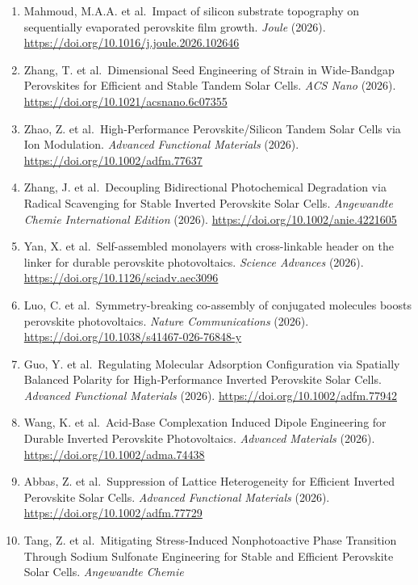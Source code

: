 \documentclass[
  11pt,
]{article}
\begin{document}
\begin{enumerate}
  Review. \emph{Zenodo (CERN European Organization for Nuclear
  Research)} (2026). \url{https://doi.org/10.5281/zenodo.21790600}
\item
  Mahmoud, M.A.A. et al.~Impact of silicon substrate topography on
  sequentially evaporated perovskite film growth. \emph{Joule} (2026).
  \url{https://doi.org/10.1016/j.joule.2026.102646}
\item
  Zhang, T. et al.~Dimensional Seed Engineering of Strain in
  Wide-Bandgap Perovskites for Efficient and Stable Tandem Solar Cells.
  \emph{ACS Nano} (2026). \url{https://doi.org/10.1021/acsnano.6c07355}
\item
  Zhao, Z. et al.~High‐Performance Perovskite/Silicon Tandem Solar Cells
  via Ion Modulation. \emph{Advanced Functional Materials} (2026).
  \url{https://doi.org/10.1002/adfm.77637}
\item
  Zhang, J. et al.~Decoupling Bidirectional Photochemical Degradation
  via Radical Scavenging for Stable Inverted Perovskite Solar Cells.
  \emph{Angewandte Chemie International Edition} (2026).
  \url{https://doi.org/10.1002/anie.4221605}
\item
  Yan, X. et al.~Self-assembled monolayers with cross-linkable header on
  the linker for durable perovskite photovoltaics. \emph{Science
  Advances} (2026). \url{https://doi.org/10.1126/sciadv.aec3096}
\item
  Luo, C. et al.~Symmetry-breaking co-assembly of conjugated molecules
  boosts perovskite photovoltaics. \emph{Nature Communications} (2026).
  \url{https://doi.org/10.1038/s41467-026-76848-y}
\item
  Guo, Y. et al.~Regulating Molecular Adsorption Configuration via
  Spatially Balanced Polarity for High‐Performance Inverted Perovskite
  Solar Cells. \emph{Advanced Functional Materials} (2026).
  \url{https://doi.org/10.1002/adfm.77942}
\item
  Wang, K. et al.~Acid‐Base Complexation Induced Dipole Engineering for
  Durable Inverted Perovskite Photovoltaics. \emph{Advanced Materials}
  (2026). \url{https://doi.org/10.1002/adma.74438}
\item
  Abbas, Z. et al.~Suppression of Lattice Heterogeneity for Efficient
  Inverted Perovskite Solar Cells. \emph{Advanced Functional Materials}
  (2026). \url{https://doi.org/10.1002/adfm.77729}
\item
  Tang, Z. et al.~Mitigating Stress‐Induced Nonphotoactive Phase
  Transition Through Sodium Sulfonate Engineering for Stable and
  Efficient Perovskite Solar Cells. \emph{Angewandte Chemie
}
\end{enumerate}
\end{document}
